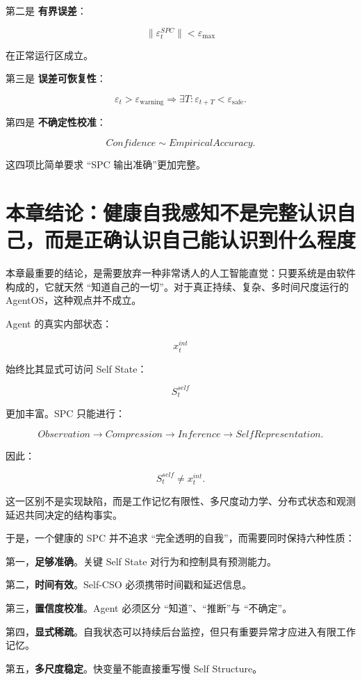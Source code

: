 第二是 \textbf{有界误差}：

\[
\|\varepsilon_t^{SPC}\|
<
\varepsilon_{\max}
\]

在正常运行区成立。

第三是 \textbf{误差可恢复性}：

\[
\varepsilon_t
>
\varepsilon_{\mathrm{warning}}
\Rightarrow
\exists T:
\varepsilon_{t+T}
<
\varepsilon_{\mathrm{safe}}.
\]

第四是 \textbf{不确定性校准}：

\[
Confidence
\sim
EmpiricalAccuracy.
\]

这四项比简单要求 ``SPC 输出准确''更加完整。

\section{本章结论：健康自我感知不是完整认识自己，而是正确认识自己能认识到什么程度}

本章最重要的结论，是需要放弃一种非常诱人的人工智能直觉：只要系统是由软件构成的，它就天然 ``知道自己的一切''。对于真正持续、复杂、多时间尺度运行的 AgentOS，这种观点并不成立。

Agent 的真实内部状态：

\[
x_t^{int}
\]

始终比其显式可访问 Self State：

\[
S_t^{self}
\]

更加丰富。SPC 只能进行：

\[
Observation
\rightarrow
Compression
\rightarrow
Inference
\rightarrow
SelfRepresentation.
\]

因此：

\[
\boxed{
S_t^{self}
\neq
x_t^{int}.
}
\]

这一区别不是实现缺陷，而是工作记忆有限性、多尺度动力学、分布式状态和观测延迟共同决定的结构事实。

于是，一个健康的 SPC 并不追求 ``完全透明的自我''，而需要同时保持六种性质：

第一，\textbf{足够准确}。关键 Self State 对行为和控制具有预测能力。

第二，\textbf{时间有效}。Self-CSO 必须携带时间戳和延迟信息。

第三，\textbf{置信度校准}。Agent 必须区分 ``知道''、``推断''与 ``不确定''。

第四，\textbf{显式稀疏}。自我状态可以持续后台监控，但只有重要异常才应进入有限工作记忆。

第五，\textbf{多尺度稳定}。快变量不能直接重写慢 Self Structure。

